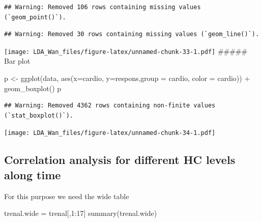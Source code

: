 \documentclass[
]{article}
\newenvironment{Shaded}{\begin{snugshade}}{\end{snugshade}}
\newcommand{\AttributeTok}[1]{\textcolor[rgb]{0.77,0.63,0.00}{#1}}
\newcommand{\DecValTok}[1]{\textcolor[rgb]{0.00,0.00,0.81}{#1}}
\newcommand{\FunctionTok}[1]{\textcolor[rgb]{0.00,0.00,0.00}{#1}}
\newcommand{\NormalTok}[1]{#1}
\newcommand{\OtherTok}[1]{\textcolor[rgb]{0.56,0.35,0.01}{#1}}
\newcommand{\SpecialCharTok}[1]{\textcolor[rgb]{0.00,0.00,0.00}{#1}}
\begin{document}
\begin{verbatim}
## Warning: Removed 106 rows containing missing values (`geom_point()`).
\end{verbatim}

\begin{verbatim}
## Warning: Removed 30 rows containing missing values (`geom_line()`).
\end{verbatim}

\texttt{[image: LDA\_Wan\_files/figure-latex/unnamed-chunk-33-1.pdf]}
\#\#\#\#\# Bar plot

\begin{Shaded}
\begin{Highlighting}[]
\NormalTok{p }\OtherTok{\textless{}{-}} \FunctionTok{ggplot}\NormalTok{(data, }\FunctionTok{aes}\NormalTok{(}\AttributeTok{x=}\NormalTok{cardio, }\AttributeTok{y=}\NormalTok{respons,}\AttributeTok{group =}\NormalTok{ cardio, }\AttributeTok{color =}\NormalTok{ cardio)) }\SpecialCharTok{+}  
  \FunctionTok{geom\_boxplot}\NormalTok{()}
\NormalTok{p}
\end{Highlighting}
\end{Shaded}

\begin{verbatim}
## Warning: Removed 4362 rows containing non-finite values (`stat_boxplot()`).
\end{verbatim}

\texttt{[image: LDA\_Wan\_files/figure-latex/unnamed-chunk-34-1.pdf]}

\hypertarget{correlation-analysis-for-different-hc-levels-along-time}{%
\subsection{Correlation analysis for different HC levels along
time}\label{correlation-analysis-for-different-hc-levels-along-time}}

For this purpose we need the wide table

\begin{Shaded}
\begin{Highlighting}[]
\NormalTok{trenal.wide }\OtherTok{=}\NormalTok{ trenal[,}\DecValTok{1}\SpecialCharTok{:}\DecValTok{17}\NormalTok{]}
\FunctionTok{summary}\NormalTok{(trenal.wide)}
\end{Highlighting}
\end{Shaded}
\end{document}
